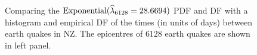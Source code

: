 {%
\begin{figure}[htpb]
\caption{Comparing the $\mbox{{\rm Exponential}}(\widehat{\lambda}_{6128}= 28.6694)$ PDF and DF with a histogram and empirical DF of the times (in units of days) between earth quakes in  NZ.  The epicentres of $6128$ earth quakes are shown in left panel.\label{F:NZSIEarthQuakesExponentialMLE}}

\end{figure}}
